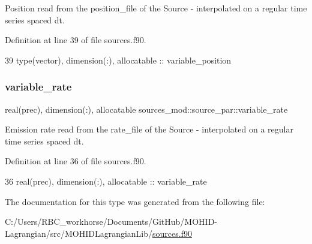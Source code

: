 Position read from the position\+\_\+file of the Source -\/ interpolated on a regular time series spaced dt. 



Definition at line 39 of file sources.\+f90.


\begin{DoxyCode}
39         \textcolor{keywordtype}{type}(vector), \textcolor{keywordtype}{dimension(:)}, \textcolor{keywordtype}{allocatable} :: variable\_position
\end{DoxyCode}
\mbox{\label{structsources__mod_1_1source__par_ad5a8b90aed8636e98daafb1ede1390fd}} 
\subsubsection{\texorpdfstring{variable\+\_\+rate}{variable\_rate}}
{\footnotesize\ttfamily real(prec), dimension(\+:), allocatable sources\+\_\+mod\+::source\+\_\+par\+::variable\+\_\+rate\hspace{0.3cm}{\ttfamily [private]}}



Emission rate read from the rate\+\_\+file of the Source -\/ interpolated on a regular time series spaced dt. 



Definition at line 36 of file sources.\+f90.


\begin{DoxyCode}
36         \textcolor{keywordtype}{real(prec)}, \textcolor{keywordtype}{dimension(:)}, \textcolor{keywordtype}{allocatable} :: variable\_rate
\end{DoxyCode}


The documentation for this type was generated from the following file\+:\begin{DoxyCompactItemize}
\item 
C\+:/\+Users/\+R\+B\+C\+\_\+workhorse/\+Documents/\+Git\+Hub/\+M\+O\+H\+I\+D-\/\+Lagrangian/src/\+M\+O\+H\+I\+D\+Lagrangian\+Lib/\mbox{\hyperlink{sources_8f90}{sources.\+f90}}\end{DoxyCompactItemize}
